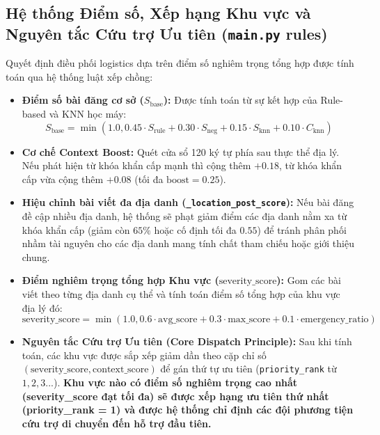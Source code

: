 \documentclass[12pt,a4paper]{article}
\begin{document}
\begin{itemize}
\subsection{Hệ thống Điểm số, Xếp hạng Khu vực và Nguyên tắc Cứu trợ Ưu tiên (\texttt{main.py} rules)}
Quyết định điều phối logistics dựa trên điểm số nghiêm trọng tổng hợp được tính toán qua hệ thống luật xếp chồng:
\begin{itemize}
    \item \textbf{Điểm số bài đăng cơ sở ($S_{\text{base}}$):} Được tính toán từ sự kết hợp của Rule-based và KNN học máy:
        \begin{equation}
        S_{\text{base}} = \min\left(1.0, 0.45 \cdot S_{\text{rule}} + 0.30 \cdot S_{\text{neg}} + 0.15 \cdot S_{\text{knn}} + 0.10 \cdot C_{\text{knn}}\right)
        \end{equation}
    \item \textbf{Cơ chế Context Boost:} Quét cửa sổ 120 ký tự phía sau thực thể địa lý. Nếu phát hiện từ khóa khẩn cấp mạnh thì cộng thêm $+0.18$, từ khóa khẩn cấp vừa cộng thêm $+0.08$ (tối đa $\text{boost} = 0.25$).
    \item \textbf{Hiệu chỉnh bài viết đa địa danh (\texttt{\_location\_post\_score}):} Nếu bài đăng đề cập nhiều địa danh, hệ thống sẽ phạt giảm điểm các địa danh nằm xa từ khóa khẩn cấp (giảm còn $65\%$ hoặc cố định tối đa $0.55$) để tránh phân phối nhầm tài nguyên cho các địa danh mang tính chất tham chiếu hoặc giới thiệu chung.
    \item \textbf{Điểm nghiêm trọng tổng hợp Khu vực ($\text{severity\_score}$):} Gom các bài viết theo từng địa danh cụ thể và tính toán điểm số tổng hợp của khu vực địa lý đó:
        \begin{equation}
        \text{severity\_score} = \min\left(1.0, 0.6 \cdot \text{avg\_score} + 0.3 \cdot \text{max\_score} + 0.1 \cdot \text{emergency\_ratio}\right)
        \end{equation}
    \item \textbf{Nguyên tắc Cứu trợ Ưu tiên (Core Dispatch Principle):} Sau khi tính toán, các khu vực được sắp xếp giảm dần theo cặp chỉ số $(\text{severity\_score}, \text{context\_score})$ để gán thứ tự ưu tiên (\texttt{priority\_rank} từ $1, 2, 3...$). \textbf{Khu vực nào có điểm số nghiêm trọng cao nhất (severity\_score đạt tối đa) sẽ được xếp hạng ưu tiên thứ nhất (priority\_rank = 1) và được hệ thống chỉ định các đội phương tiện cứu trợ di chuyển đến hỗ trợ đầu tiên.}
\end{itemize}


\end{itemize}
\end{document}
